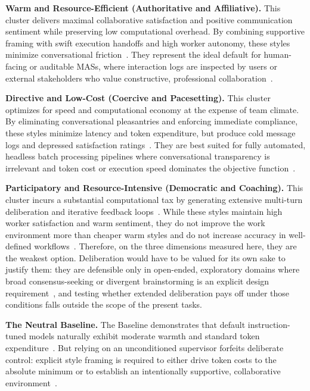 \textbf{Warm and Resource-Efficient (Authoritative and Affiliative).}
This cluster delivers maximal collaborative satisfaction and positive communication sentiment while preserving low computational overhead.
By combining supportive framing with swift execution handoffs and high worker autonomy, these styles minimize conversational friction~\cite{goleman2000leadership, wageman2005teamdiagnosticsurvey}.
They represent the ideal default for human-facing or auditable \acp{MAS}, where interaction logs are inspected by users or external stakeholders who value constructive, professional collaboration~\cite{amershi2019humanaiinteraction, almutairi2025taifaautomatedfeedback}.

\textbf{Directive and Low-Cost (Coercive and Pacesetting).}
This cluster optimizes for speed and computational economy at the expense of team climate.
By eliminating conversational pleasantries and enforcing immediate compliance, these styles minimize latency and token expenditure, but produce cold message logs and depressed satisfaction ratings~\cite{goleman2000leadership, zhang2024cutcrapeconomicalcommunication}.
They are best suited for fully automated, headless batch processing pipelines where conversational transparency is irrelevant and token cost or execution speed dominates the objective function~\cite{hong2024metagptmetaprogrammingmultiagent}.

\textbf{Participatory and Resource-Intensive (Democratic and Coaching).}
This cluster incurs a substantial computational tax by generating extensive multi-turn deliberation and iterative feedback loops~\cite{zhang2024cutcrapeconomicalcommunication, chen2023agentversefacilitatingmultiagentcollaboration}.
While these styles maintain high worker satisfaction and warm sentiment, they do not improve the work environment more than cheaper warm styles and do not increase accuracy in well-defined workflows~\cite{kwak2026leadershipcoordinationcontrolbehavioral}. 
Therefore, on the three dimensions measured here, they are the weakest option.
Deliberation would have to be valued for its own sake to justify them: they are defensible only in open-ended, exploratory domains where broad consensus-seeking or divergent brainstorming is an explicit design requirement~\cite{goleman2000leadership, chen2023agentversefacilitatingmultiagentcollaboration}, and testing whether extended deliberation pays off under those conditions falls outside the scope of the present tasks.

\textbf{The Neutral Baseline.}
The Baseline demonstrates that default instruction-tuned models naturally exhibit moderate warmth and standard token expenditure~\cite{serapiogarcia2025personalitytraitslargelanguage, lacava2025openmodelsclosedminds}.
But relying on an unconditioned supervisor forfeits deliberate control: explicit style framing is required to either drive token costs to the absolute minimum or to establish an intentionally supportive, collaborative environment~\cite{shanahan2023roleplaylargelanguagemodels, white2023promptpatterncatalogenhance}.

